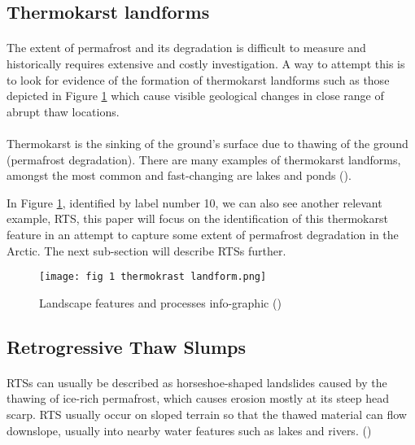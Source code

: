 \subsection{Thermokarst landforms}  \label{thermokarst_intro}

\paragraph{}
The extent of permafrost and its degradation is difficult to measure and historically requires extensive and costly investigation. A way to attempt this is to look for evidence of the formation of thermokarst landforms such as those depicted in Figure \ref{fig_thermokrast} which cause visible geological changes in close range of abrupt thaw locations.

\paragraph{}
Thermokarst is the sinking of the ground's surface due to thawing of the ground (permafrost degradation). There are many examples of thermokarst landforms, amongst the most common and fast-changing are lakes and ponds (\cite{thawpic}).

In Figure \ref{fig_thermokrast}, identified by label number 10, we can also see another relevant example, \gls{RTS}, this paper will focus on the identification of this thermokarst feature in an attempt to capture some extent of permafrost degradation in the Arctic. The next sub-section will describe \gls{RTS}s further.

    \begin{figure}[hbt!]
        \centering
        \texttt{[image: fig 1 thermokrast landform.png]}
        \caption{Landscape features and processes info-graphic (\cite{rs13061217})}
        \label{fig_thermokrast}
    \end{figure}



\subsection{Retrogressive Thaw Slumps}  \label{rts_intro}

\paragraph{}
\gls{RTS}s can usually be described as horseshoe-shaped landslides caused by the thawing of ice-rich permafrost, which causes erosion mostly at its steep head scarp. \gls{RTS} usually occur on sloped terrain so that the thawed material can flow downslope, usually into nearby water features such as lakes and rivers. (\cite{articleperma})
 
